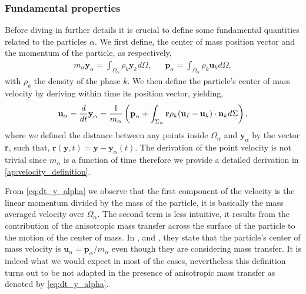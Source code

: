 \subsubsection*{Fundamental properties }

Before diving in further details it is crucial to define some fundamental quantities related to the particles $\alpha$.
We first define, the center of mass position vector and the momentum of the particle, as respectively,
\begin{align}
    m_\alpha \textbf{y}_\alpha
    = \int_{\Omega_\alpha} \rho_k \textbf{y}_k d\Omega,
    &&
    \textbf{p}_\alpha 
    = \int_{\Omega_\alpha} \rho_k \textbf{u}_k d\Omega,
    \label{eq:position_and_momentum_def}
\end{align}
with $\rho_k$ the density of the phase $k$. 
We then define the particle's center of mass velocity by deriving within time its position vector, yielding,
\begin{equation}
    \textbf{u}_\alpha = \frac{d}{d t} \textbf{y}_\alpha
    = \frac{1}{m_\alpha} \left(
        \textbf{p}_\alpha
        +  \int_{\Sigma_\alpha} \textbf{r} \rho_k (\textbf{u}_I - \textbf{u}_k)\cdot \textbf{n}_k d\Sigma
        \right),
        \label{eq:dt_y_alpha}
\end{equation}
where we defined the distance between any points inside $\Omega_\alpha$ and $\textbf{y}_\alpha$ by the vector \textbf{r}, such that, $\textbf{r}(\textbf{y},t) = \textbf{y} - \textbf{y}_\alpha(t)$.
The derivation of the point velocity is not trivial since $m_\alpha$ is a function of time therefore we provide a detailed derivation in \ref{ap:velocity_definition}.

From \ref{eq:dt_y_alpha} we observe that the first component of the velocity is the linear momentum divided by the mass of the particle, it is basically the mass averaged velocity over $\Omega_\alpha$.
The second term is less intuitive, it results from the contribution of the anisotropic mass transfer across the surface of the particle to the motion of the center of mass.
In \citet{zaepffel2011modelisation}, \citet{paisant2014modelisation} and \citet{morel2015mathematical}, they state that the particle's center of mass velocity is $\textbf{u}_\alpha = \textbf{p}_\alpha / m_\alpha$ even though they are considering mass transfer.
It is indeed what we would expect in most of the cases, nevertheless this definition turns out to be not adapted in the presence of anisotropic mass transfer as denoted by \ref{eq:dt_y_alpha}.

